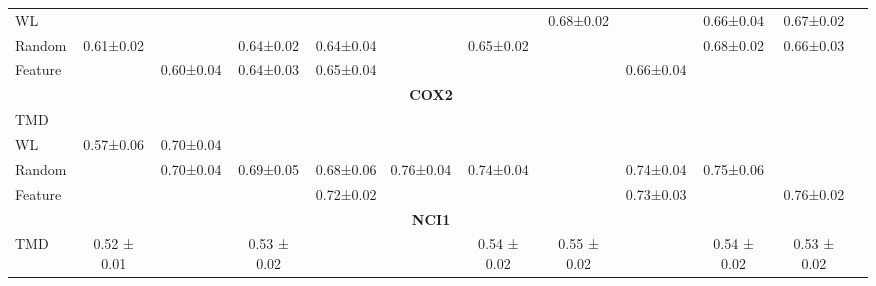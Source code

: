 \begin{table}[ht]
{\begin{tabular}{lccccccccccc}
WL & \cellcolor{green!25}{0.62±0.02} & \cellcolor{green!80}{0.65±0.03} & \cellcolor{green!25}{0.68±0.02} & \cellcolor{green!25}{0.68±0.02} & \cellcolor{green!80}{0.68±0.01} & \cellcolor{green!25}{0.67±0.02} & 0.68±0.02 & \cellcolor{green!80}{0.69±0.02} & 0.66±0.04 & 0.67±0.02 \\
Random & 0.61±0.02 & \cellcolor{green!25}{0.64±0.02} & 0.64±0.02 & 0.64±0.04 & \cellcolor{green!25}{0.67±0.02} & 0.65±0.02 & \cellcolor{green!25}{0.69±0.02} & \cellcolor{green!25}{0.67±0.02} & 0.68±0.02 & 0.66±0.03 \\
Feature & \cellcolor{green!25}{0.62±0.03} & 0.60±0.04 & 0.64±0.03 & 0.65±0.04 & \cellcolor{green!80}{0.68±0.03} & \cellcolor{green!25}{0.67±0.03} & \cellcolor{green!80}{0.70±0.02} & 0.66±0.04 & \cellcolor{green!80}{0.71±0.02} & \cellcolor{green!80}{0.72±0.01} \\
\midrule
\multicolumn{11}{c}{\textbf{COX2}} \\
\midrule
TMD & \cellcolor{green!80}{0.70±0.04} & \cellcolor{green!80}{0.76±0.02} & \cellcolor{green!80}{0.75±0.03} & \cellcolor{green!80}{0.78±0.02} & \cellcolor{green!80}{0.78±0.02} & \cellcolor{green!80}{0.77±0.01} & \cellcolor{green!80}{0.77±0.01} & \cellcolor{green!80}{0.78±0.02} & \cellcolor{green!25}{0.77±0.02} & \cellcolor{green!80}{0.78±0.02} \\
WL & 0.57±0.06 & 0.70±0.04 & \cellcolor{green!80}{0.75±0.02} & \cellcolor{green!25}{0.76±0.02} & \cellcolor{green!25}{0.77±0.02} & \cellcolor{green!80}{0.77±0.02} & \cellcolor{green!80}{0.77±0.02} & \cellcolor{green!25}{0.77±0.02} & \cellcolor{green!80}{0.78±0.02} & \cellcolor{green!80}{0.78±0.01} \\
Random & \cellcolor{green!25}{0.65±0.07} & 0.70±0.04 & 0.69±0.05 & 0.68±0.06 & 0.76±0.04 & 0.74±0.04 & \cellcolor{green!25}{0.74±0.03} & 0.74±0.04 & 0.75±0.06 & \cellcolor{green!25}{0.77±0.03} \\
Feature & \cellcolor{green!25}{0.65±0.06} & \cellcolor{green!25}{0.72±0.05} & \cellcolor{green!25}{0.71±0.04} & 0.72±0.02 & \cellcolor{green!80}{0.78±0.01} & \cellcolor{green!25}{0.75±0.03} & \cellcolor{green!25}{0.74±0.04} & 0.73±0.03 & \cellcolor{green!80}{0.78±0.02} & 0.76±0.02 \\
\midrule
\multicolumn{11}{c}{\textbf{NCI1}} \\
\midrule
TMD & 0.52 ± 0.01 & \cellcolor{green!25}{0.54 ± 0.02} & 0.53 ± 0.02 & \cellcolor{green!25}{0.51 ± 0.01} & \cellcolor{green!25}{0.52 ± 0.01} & 0.54 ± 0.02 & 0.55 ± 0.02 & \cellcolor{green!25}{0.52 ± 0.01} & 0.54 ± 0.02 & 0.53 ± 0.02 \\

\end{tabular}}
\end{table}
